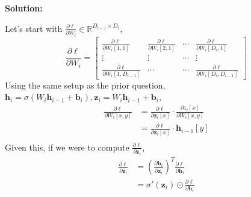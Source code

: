 \documentclass{article}
\newenvironment{solution}
  {\par\noindent\textbf{Solution:}\par}
  {\par}
\begin{document}
\subsection{}
\begin{solution}
  Let's start with $\frac{\partial \ell}{\partial W_i} \in \mathbb{R}^{D_{i-1} \times D_{i}}$,
  \[
    \frac{\partial \ell}{\partial W_i} = \begin{bmatrix} 
      \frac{\partial \ell}{\partial W_i[1,1]} & \frac{\partial \ell}{\partial W_i[2,1]} & \cdots & \frac{\partial \ell}{\partial W_i[D_{i},1]} \\ 
      \vdots & \vdots & \cdots & \vdots \\ 
      \frac{\partial \ell}{\partial W_i[1,D_{i-1}]} & \cdots & \cdots & \frac{\partial \ell}{\partial W_i[D_{i},D_{i-1}]}
      
    \end{bmatrix}
  \]
  Using the same setup as the prior question, $\textbf{h}_i = \sigma(W_i\textbf{h}_{i-1} + \textbf{b}_i), \textbf{z}_i = W_i\textbf{h}_{i-1} + \textbf{b}_i$,
  \[
  \begin{aligned}
    \frac{\partial \ell}{\partial W_i[x,y]} &= \frac{\partial \ell}{\partial \textbf{z}_i[x]} \cdot \frac{\partial z_i[x]}{\partial W_i[x,y]} \\ 
                                            &= \frac{\partial \ell}{\partial \textbf{z}_i[x]} \cdot \textbf{h}_{i-1}[y] \\ 
  \end{aligned}
  \]
  Given this, if we were to compute $\frac{\partial \ell}{\partial \textbf{z}_i}$,
  \[
    \begin{aligned}
      \frac{\partial \ell}{\partial \textbf{z}_i} &= \left( \frac{\partial \textbf{h}_i}{\partial  \textbf{z}_i} \right)^T \frac{\partial \ell}{\partial \textbf{h}_i} \\ 
                                         &= \sigma'(\textbf{z}_i) \odot \frac{\partial \ell}{\partial \textbf{h}_i}  
    \end{aligned}
  \]


\end{solution}
\end{document}
